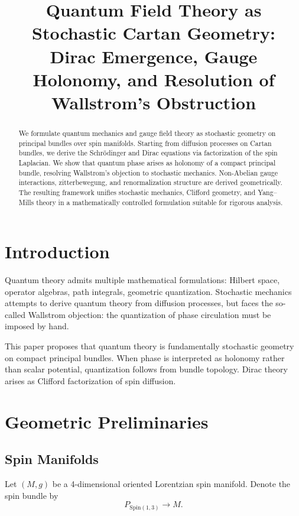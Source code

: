 \documentclass[11pt]{article}
\title{\textbf{Quantum Field Theory as Stochastic Cartan Geometry:\\
Dirac Emergence, Gauge Holonomy, and Resolution of Wallstrom’s Obstruction}}
\author{ }
\date{}
\theoremstyle{remark}
\newcommand{\Spin}{\mathrm{Spin}}
\begin{document}
\maketitle

\begin{abstract}
We formulate quantum mechanics and gauge field theory as stochastic geometry on principal bundles over spin manifolds. 
Starting from diffusion processes on Cartan bundles, we derive the Schr\"odinger and Dirac equations via factorization of the spin Laplacian. 
We show that quantum phase arises as holonomy of a compact principal bundle, resolving Wallstrom’s objection to stochastic mechanics. 
Non-Abelian gauge interactions, zitterbewegung, and renormalization structure are derived geometrically. 
The resulting framework unifies stochastic mechanics, Clifford geometry, and Yang--Mills theory in a mathematically controlled formulation suitable for rigorous analysis.
\end{abstract}

\tableofcontents

\section{Introduction}

Quantum theory admits multiple mathematical formulations: Hilbert space, operator algebras, path integrals, geometric quantization. 
Stochastic mechanics attempts to derive quantum theory from diffusion processes, but faces the so-called Wallstrom objection: 
the quantization of phase circulation must be imposed by hand.

This paper proposes that quantum theory is fundamentally stochastic geometry on compact principal bundles. 
When phase is interpreted as holonomy rather than scalar potential, quantization follows from bundle topology. 
Dirac theory arises as Clifford factorization of spin diffusion.

\section{Geometric Preliminaries}

\subsection{Spin Manifolds}

Let $(M,g)$ be a 4-dimensional oriented Lorentzian spin manifold. 
Denote the spin bundle by
\[
P_{\Spin(1,3)} \to M.
\]
\end{document}
